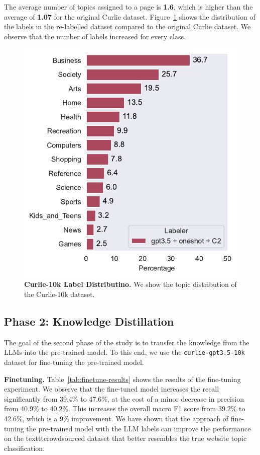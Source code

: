 The average number of topics assigned to a page is \textbf{1.6}, which is higher than the average of \textbf{1.07} for the original Curlie dataset. 
Figure~\ref{fig:label-distribution-comparison} shows the distribution of the labels in the re-labelled dataset compared to the original Curlie dataset.
We observe that the number of labels increased for every class.

\begin{figure}[!h]
    \centering
    \includegraphics[width=.8\columnwidth]{figures/curlie-label-distribution.pdf}
    \caption{\textbf{Curlie-10k Label Distributino.} We show the topic distribution of the Curlie-10k dataset.}
    \label{fig:label-distribution-comparison}
\end{figure}


\subsection*{Phase 2: Knowledge Distillation}


The goal of the second phase of the study is to transfer the knowledge from the LLMs into the pre-trained model. 
To this end, we use the \texttt{curlie-gpt3.5-10k} dataset for fine-tuning the pre-trained model.


\textbf{Finetuning.} Table~\ref{tab:finetune-results} shows the results of the fine-tuning experiment. 
We observe that the fine-tuned model increases the recall significantly from 39.4\% to 47.6\%, at the cost of a minor decrease in precision from 40.9\% to 40.2\%. 
This increases the overall macro F1 score from 39.2\% to 42.6\%, which is a 9\% improvement. 
We have shown that the approach of fine-tuning the pre-trained model with the LLM labels can improve the performance on the texttt{crowdsourced} dataset that better resembles the true website topic classification.

